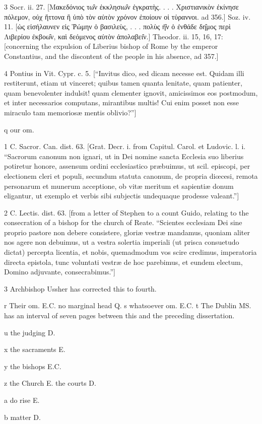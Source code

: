 3
Socr. ii. 27. [Μακεδόνιος τω̑ν ἐκκλησιω̑ν ἐγκρατὴς. . . . Χριστιανικὸν ἐκίνησε πόλεμον, οὐχ ἥττονα ἢ ὑπὸ τὸν αὐτὸν χρόνον ἐποίουν οἱ τὑραννοι. ad 356.] Soz. iv. 11. [ὡς εἰσήλαυνεν εἰς Ῥώμην ὁ βασιλεὺς, . . . πολὺς ἠ̑ν ὁ ἐνθάδε δη̑μος περὶ Λιβερίου ἐκβοω̑ν, καὶ δεόμενος αὐτὸν ἀπολαβει̑ν.] Theodor. ii. 15, 16, 17: [concerning the expulsion of Liberius bishop of Rome by the emperor Constantius, and the discontent of the people in his absence, ad 357.]

4
Pontius in Vit. Cypr. c. 5. [“Invitus dico, sed dicam necesse est. Quidam illi restiterunt, etiam ut vinceret; quibus tamen quanta lenitate, quam patienter, quam benevolenter indulsit! quam clementer ignovit, amicissimos eos postmodum, et inter necessarios computans, mirantibus multis! Cui enim posset non esse miraculo tam memoriosæ mentis oblivio?”]

q
our om.

1
C. Sacror. Can. dist. 63. [Grat. Decr. i. from Capitul. Carol. et Ludovic. l. i. “Sacrorum canonum non ignari, ut in Dei nomine sancta Ecclesia suo liberius potiretur honore, assensum ordini ecclesiastico præbuimus, ut scil. episcopi, per electionem cleri et populi, secundum statuta canonum, de propria diœcesi, remota personarum et munerum acceptione, ob vitæ meritum et sapientiæ donum eligantur, ut exemplo et verbis sibi subjectis undequaque prodesse valeant.”]

2
C. Lectis. dist. 63. [from a letter of Stephen to a count Guido, relating to the consecration of a bishop for the church of Reate. “Scientes ecclesiam Dei sine proprio pastore non debere consistere, gloriæ vestræ mandamus, quoniam aliter nos agere non debuimus, ut a vestra solertia imperiali (ut prisca consuetudo dictat) percepta licentia, et nobis, quemadmodum vos scire credimus, imperatoria directa epistola, tunc voluntati vestræ de hoc parebimus, et eundem electum, Domino adjuvante, consecrabimus.”]

3
Archbishop Ussher has corrected this to fourth.

r Their om. E.C. no marginal head Q.
s whatsoever om. E.C.
t
The Dublin MS. has an interval of seven pages between this and the preceding dissertation.

u
the judging D.

x
the sacraments E.

y
the bishops E.C.

z
the Church E. the courts D.

a
do rise E.

b
matter D.

